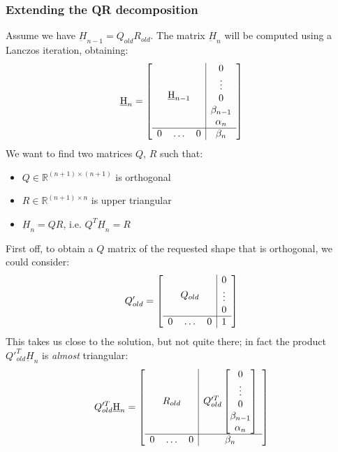 \documentclass{article}
\newcommand{\reals}{\mathbb R}
\newcommand{\rmatr}[2]{\reals ^ {{#1} \times {#2}} }
\begin{document}
\subsubsection{Extending the QR decomposition}
Assume we have $\underbar H_{n-1} = Q_{old}R_{old}$. The matrix $\underbar H_n$ will be computed using a Lanczos iteration, obtaining:
\[\underbar H_n = \left[\begin{array}{ c | c }
    \underbar H_{n-1} & \begin{matrix}
           0\\
           \vdots\\
           0\\
           \beta_{n-1}\\
           \alpha_n\\
          \end{matrix}
 \\
    \hline
    0 \quad\hdots\quad 0 & \beta_n
  \end{array}\right]
\]
We want to find two matrices $Q$, $R$ such that:
\begin{itemize}
 \item $Q\in \rmatr{(n+1)}{(n+1)}$ is orthogonal
 \item $R \in \rmatr{(n+1)}{n}$ is upper triangular
 \item $\underbar H_n = QR$, i.e. $Q^T \underbar H_n = R$
\end{itemize}
First off, to obtain a $Q$ matrix of the requested shape that is orthogonal, we could consider:
\[Q_{old}' = \left[\begin{array}{ c | c }
    Q_{old} & \begin{matrix}
           0\\
           \vdots\\
           0
          \end{matrix}
 \\
    \hline
    0 \quad\hdots\quad 0 & 1
  \end{array}\right]
\]
This takes us close to the solution, but not quite there; in fact the product $Q'^T_{old} \underbar H_n$ is \emph{almost} triangular:
\[Q'^T_{old} \underbar H_n = \left[\begin{array}{ c | c }
    R_{old} & 
           Q'^T_{old}\begin{bmatrix}
            0\\
            \vdots\\
            0\\
            \beta_{n-1}\\
            \alpha_n
           \end{bmatrix}
 \\
    \hline
    0 \quad\hdots\quad 0 & \beta_n
  \end{array}\right]
\]
\end{document}
